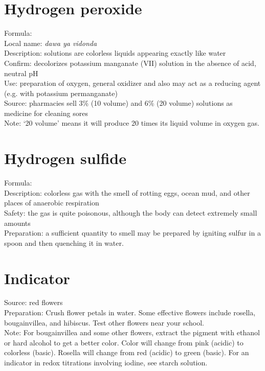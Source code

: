 \section{Hydrogen peroxide}
Formula: \\
Local name: \textit{dawa ya vidonda}\\
Description: solutions are colorless liquids 
appearing exactly like water\\
Confirm: decolorizes potassium manganate (VII) solution 
in the absence of acid, 
neutral pH\\
Use: preparation of oxygen, 
general oxidizer and also may act as a reducing agent (e.g. 
with potassium permanganate)\\
Source: pharmacies sell 3\% (10 volume) and 6\% (20 volume) solutions 
as medicine for cleaning sores\\
Note: `20 volume' means it will produce 20 times its liquid volume in oxygen gas.

\section{Hydrogen sulfide}
Formula: \\
Description: colorless gas with the smell of rotting eggs, 
ocean mud, 
and other places of anaerobic respiration\\
Safety: the gas is quite poisonous, 
although the body can detect extremely small amounts\\
Preparation: a sufficient quantity to smell 
may be prepared by igniting sulfur in a spoon 
and then quenching it in water.

\section{Indicator}
\label{sec:indicator}
Source: red flowers\\
Preparation: Crush flower petals in water. 
Some effective flowers include rosella, 
bougainvillea, 
and hibiscus. 
Test other flowers near your school.\\
Note: For bougainvillea and some other flowers, 
extract the pigment with ethanol 
or hard alcohol to get a better color. 
Color will change from pink (acidic) to colorless (basic). 
Rosella will change from red (acidic) to green (basic).
For an indicator in redox titrations involving iodine, 
see starch solution.

